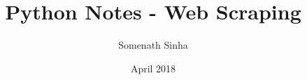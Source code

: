 

\title{Python Notes - Web Scraping}
\author{Somenath Sinha}
\date{April 2018}


	\maketitle
	\newpage
	\tableofcontents
	
	
	
	
